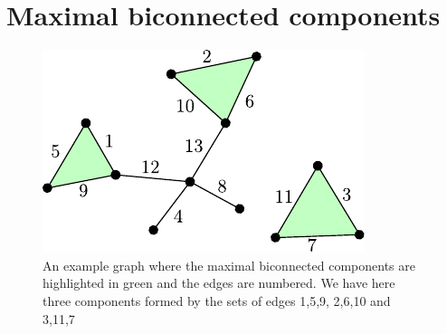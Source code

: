 \section{Maximal biconnected components}
\begin{figure}[h]
    \centering
    \includegraphics{./img/ch2-bicon.pdf}
    \caption{An example graph where the maximal biconnected 
    components are highlighted in green and the edges are numbered. 
    We have here three components formed by the sets of edges {1,5,9}, {2,6,10} and {3,11,7} }
    \label{img:bicon_comps}
\end{figure}
